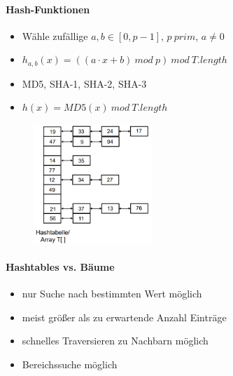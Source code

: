 \documentclass[
    ngerman,
    color=3b,
    load_common, %
    summary,
    boxarc,
]{tuda_summary}
\begin{document}
\paragraph{Hash-Funktionen}
\begin{description}[itemsep=1em,leftmargin=6cm]
    \item [Universelle Hash-Funktion]
          \begin{itemize}
              \item Wähle zufällige $a,b \in [0, p - 1]$, $p~prim$, $a \neq 0$
              \item $h_{a,b}(x)= ((a \cdot x + b)~mod~p)~mod~T.length$
          \end{itemize}
    \item [Krypthographische Hash-Funktionen]%
          \begin{itemize}%
              \item MD5, SHA-1, SHA-2, SHA-3
              \item $h(x) = MD5(x)~mod~T.length$
          \end{itemize}
\end{description}
\begin{figure}
    \includegraphics[width=0.4\textwidth]{pictures/hashtableLinkedList.PNG}
\end{figure}
\paragraph{Hashtables vs. Bäume}
\begin{description}[itemsep=1em,leftmargin=2cm]
    \item [Hashtables]
          \begin{itemize}
              \item nur Suche nach bestimmten Wert möglich
              \item meist grö\ss{}er als zu erwartende Anzahl Einträge
          \end{itemize}
    \item [Bäume]
          \begin{itemize}
              \item schnelles Traversieren zu Nachbarn möglich
              \item Bereichssuche möglich
          \end{itemize}
\end{description}
\end{document}
